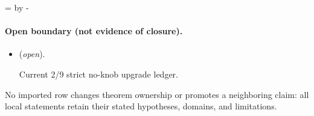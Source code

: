 \documentclass[11pt]{article}
\theoremstyle{plain}
\theoremstyle{definition}
\theoremstyle{remark}
\begin{document}
\par\begingroup{}=\pagegoal\advance{} by -\pagetotal\ifdim\dimen0<7\baselineskip\newpage\fi\endgroup
\paragraph{Open boundary (not evidence of closure).}
\begin{itemize}
\setlength{\itemsep}{0.25em}
\item {} (\emph{open}).\par Current 2/9 strict no-knob upgrade ledger.
\end{itemize}

No imported row changes theorem ownership or promotes a neighboring claim: all local statements retain their stated hypotheses, domains, and limitations.
\end{document}
